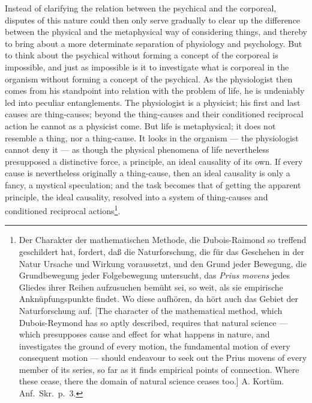 \documentclass[12pt,a4paper]{book}
\begin{document}
Instead of clarifying the relation between the psychical and the corporeal,
disputes of this nature could then only serve gradually to clear up the
difference between the physical and the metaphysical way of considering things,
and thereby to bring about a more determinate separation of physiology and
psychology. But to think about the psychical without forming a concept of the
corporeal is impossible, and just as impossible is it to investigate what is
corporeal in the organism without forming a concept of the psychical. As the
physiologist then comes from his standpoint into relation with the problem of
life, he is undeniably led into peculiar entanglements. The physiologist is a
physicist; his first and last causes are thing-causes; beyond the thing-causes
and their conditioned reciprocal action he cannot as a physicist come. But life
is metaphysical; it does not resemble a thing, nor a thing-cause. It looks in
the organism --- the physiologist cannot deny it --- as though the physical
phenomena of life nevertheless presupposed a distinctive force, a principle, an
ideal causality of its own. If
every cause is nevertheless originally a thing-cause, then an ideal causality
is only a fancy, a mystical speculation; and the task becomes that of getting
the apparent principle, the ideal causality, resolved into a system of
thing-causes and conditioned reciprocal actions\footnote{Der Charakter der
mathematischen Methode, die Dubois-Raimond so treffend geschildert hat,
fordert, daß die Naturforschung, die für das Geschehen in der Natur Ursache
und Wirkung voraussetzt, und den Grund jeder Bewegung, die Grundbewegung jeder
Folgebewegung untersucht, das \textit{Prius movens} jedes Gliedes ihrer Reihen
aufzusuchen bemüht sei, so weit, als sie empirische Anknüpfungspunkte findet.
Wo diese aufhören, da hört auch das Gebiet der Naturforschung auf. [The
character of the mathematical method, which Dubois-Reymond has so aptly
described, requires that natural science --- which presupposes cause and effect
for what happens in nature, and investigates the ground of every motion, the
fundamental motion of every consequent motion --- should endeavour to seek out
the Prius movens of every member of its series, so far as it finds
empirical points of connection. Where these cease, there the domain of natural
science ceases too.] A. Kortüm. Anf.\ Skr.\ p.~3.}.
\end{document}
